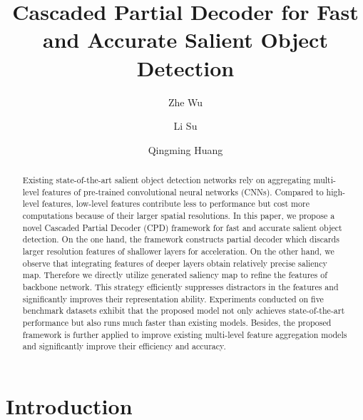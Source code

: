 \documentclass[10pt,twocolumn,letterpaper]{article}
\begin{document}
\title{Cascaded Partial Decoder for Fast and Accurate Salient Object Detection}




\author[1,2]{\rm Zhe Wu}
\author[1,2,3]{\rm Li Su}
\author[1,2,3]{\rm Qingming Huang}


\maketitle
\thispagestyle{empty}
\pagestyle{empty}

\begin{abstract}
      Existing state-of-the-art salient object detection networks rely on aggregating multi-level features of pre-trained convolutional neural networks (CNNs). Compared to high-level features, low-level features contribute less to performance but cost more computations because of their larger spatial resolutions. In this paper, we propose a novel Cascaded Partial Decoder (CPD) framework for fast and accurate salient object detection. On the one hand, the framework constructs partial decoder which discards larger resolution features of shallower layers for acceleration. On the other hand, we observe that integrating features of deeper layers obtain relatively precise saliency map. Therefore we directly utilize generated saliency map to refine the features of backbone network. This strategy efficiently suppresses distractors in the features and significantly improves their representation ability. Experiments conducted on five benchmark datasets exhibit that the proposed model not only achieves state-of-the-art performance but also runs much faster than existing models. Besides, the proposed framework is further applied to improve existing multi-level feature aggregation models and significantly improve their efficiency and accuracy.
\end{abstract}

\section{Introduction}
\end{document}
